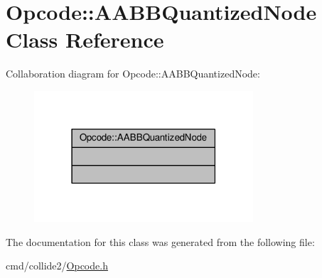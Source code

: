 \hypertarget{classOpcode_1_1AABBQuantizedNode}{}\section{Opcode\+:\+:A\+A\+B\+B\+Quantized\+Node Class Reference}
\label{classOpcode_1_1AABBQuantizedNode}


Collaboration diagram for Opcode\+:\+:A\+A\+B\+B\+Quantized\+Node\+:
\nopagebreak
\begin{figure}[H]
\begin{center}
\leavevmode
\includegraphics[width=231pt]{d4/d31/classOpcode_1_1AABBQuantizedNode__coll__graph}
\end{center}
\end{figure}


The documentation for this class was generated from the following file\+:\begin{DoxyCompactItemize}
\item 
cmd/collide2/\hyperlink{Opcode_8h}{Opcode.\+h}\end{DoxyCompactItemize}
